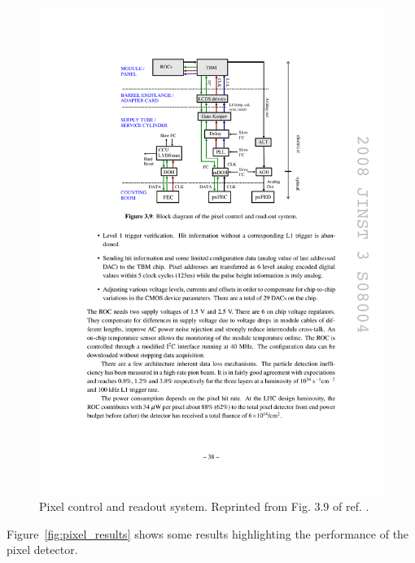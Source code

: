 \documentclass[dissertation.tex]{subfiles}
\begin{document}
\begin{figure}
	\centering
	\includegraphics[scale=1.0]{pixel_readout}
	\caption{Pixel control and readout system.  Reprinted from Fig. 3.9 of ref. \cite{CMS_detector_paper}.}
	\label{fig:pixel_readout}
\end{figure}

Figure~\ref{fig:pixel_results} shows some results highlighting the performance of the pixel detector.
\end{document}
